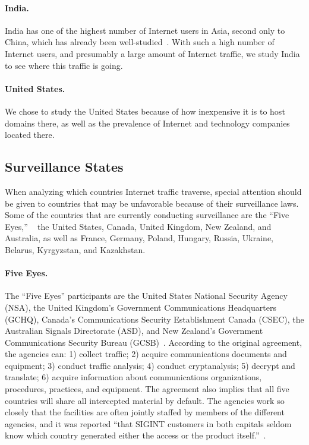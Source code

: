 \paragraph{India.}  India has one of the highest number of Internet users in Asia, second only to China, which has already been well-studied~\cite{tsui2003panopticon, wang2010discourse}.  With such a high number of Internet users, and presumably a large amount of Internet traffic, we study India to see where this traffic is going.

\paragraph{United States.}  We chose to study the United States because of how inexpensive it is to host domains there, as well as the prevalence of Internet and technology companies located there.

\subsection{Surveillance States}

When analyzing which countries Internet traffic traverse, special attention should be given to countries that may be unfavorable because of their surveillance laws.  Some of the countries that are currently conducting surveillance are the ``Five Eyes,'' ~\cite{lander2004international, eyeswideopen} the United States, Canada, United Kingdom, New Zealand, and Australia, as well as France, Germany, Poland, Hungary, Russia, Ukraine, Belarus, Kyrgyzstan, and Kazakhstan.  

\paragraph{Five Eyes.} The ``Five Eyes'' participants are the United States National Security Agency (NSA), the United Kingdom's Government Communications Headquarters (GCHQ), Canada's Communications Security Establishment Canada (CSEC), the Australian Signals Directorate (ASD), and New Zealand's Government Communications Security Bureau (GCSB)~\cite{eyeswideopen}.  According to the original agreement, the agencies can: 1) collect traffic; 2) acquire communications documents and equipment; 3) conduct traffic analysis; 4) conduct cryptanalysis; 5) decrypt and translate; 6) acquire information about communications organizations, procedures, practices, and equipment.  The agreement also implies that all five countries will share all intercepted material by default.  The agencies work so closely that the facilities are often jointly staffed by members of the different agencies, and it was reported ``that SIGINT customers in both capitals seldom know which country generated either the access or the product itself.''~\cite{lander2004international}.

